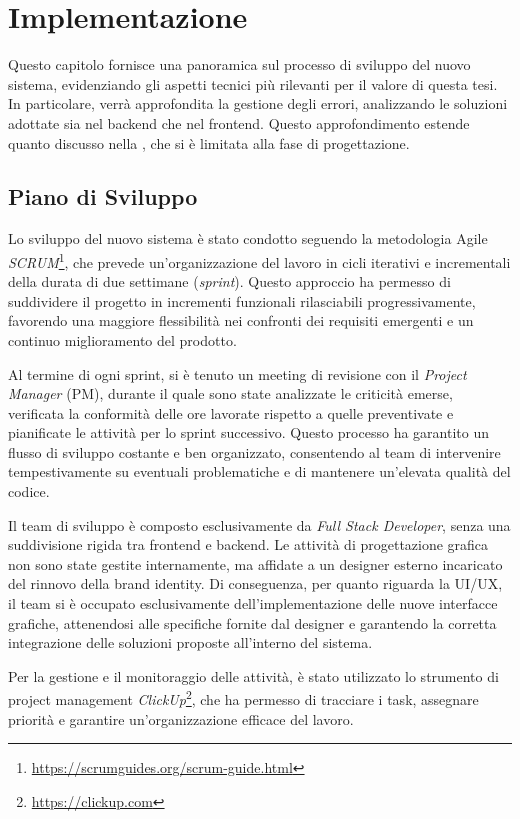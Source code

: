 \chapter{Implementazione}

Questo capitolo fornisce una panoramica sul processo di sviluppo del nuovo sistema, evidenziando gli aspetti tecnici più rilevanti per il valore di questa tesi. In particolare, verrà approfondita la gestione degli errori, analizzando le soluzioni adottate sia nel backend che nel frontend. Questo approfondimento estende quanto discusso nella , che si è limitata alla fase di progettazione.

\section{Piano di Sviluppo}
Lo sviluppo del nuovo sistema è stato condotto seguendo la metodologia Agile \textit{SCRUM}\footnote{\url{https://scrumguides.org/scrum-guide.html}}, che prevede un'organizzazione del lavoro in cicli iterativi e incrementali della durata di due settimane (\textit{sprint}). Questo approccio ha permesso di suddividere il progetto in incrementi funzionali rilasciabili progressivamente, favorendo una maggiore flessibilità nei confronti dei requisiti emergenti e un continuo miglioramento del prodotto.

Al termine di ogni sprint, si è tenuto un meeting di revisione con il \textit{Project Manager} (PM), durante il quale sono state analizzate le criticità emerse, verificata la conformità delle ore lavorate rispetto a quelle preventivate e pianificate le attività per lo sprint successivo. Questo processo ha garantito un flusso di sviluppo costante e ben organizzato, consentendo al team di intervenire tempestivamente su eventuali problematiche e di mantenere un'elevata qualità del codice.

Il team di sviluppo è composto esclusivamente da \textit{Full Stack Developer}, senza una suddivisione rigida tra frontend e backend. Le attività di progettazione grafica non sono state gestite internamente, ma affidate a un designer esterno incaricato del rinnovo della brand identity. Di conseguenza, per quanto riguarda la UI/UX, il team si è occupato esclusivamente dell'implementazione delle nuove interfacce grafiche, attenendosi alle specifiche fornite dal designer e garantendo la corretta integrazione delle soluzioni proposte all'interno del sistema.

Per la gestione e il monitoraggio delle attività, è stato utilizzato lo strumento di project management \textit{ClickUp}\footnote{\url{https://clickup.com}}, che ha permesso di tracciare i task, assegnare priorità e garantire un'organizzazione efficace del lavoro.

